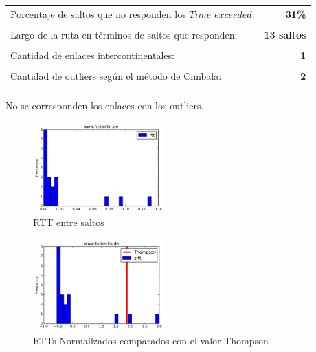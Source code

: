 \begin{center}
\begin{tabular}{p{6.5cm}r}
Porcentaje de saltos que no responden los $Time$ $exceeded$: & \textbf{31\%} \\ \\ 
Largo de la ruta en términos de saltos que responden: &\textbf{13 saltos} \\ \\
Cantidad de enlaces intercontinentales: & \textbf{1} \\ \\
Cantidad de outliers según el método de Cimbala: & \textbf{2} \\ \\
\end{tabular}
\end{center}

No se corresponden los enlaces con los outliers.

\begin{figure}[H]
  \centering
    \includegraphics[width=0.45\textwidth]{histogramas_rtt/www-fu-berlin-de.png}
  \caption{RTT entre saltos}
  \label{entropia-s}
\end{figure}

\begin{center}

\end{center}

\begin{figure}[H]
  \centering
    \includegraphics[width=0.45\textwidth]{histogramas_thompson/www-fu-berlin-de.png}
  \caption{RTTs Normailzados comparados con el valor Thompson}
  \label{entropia-s}
\end{figure}

